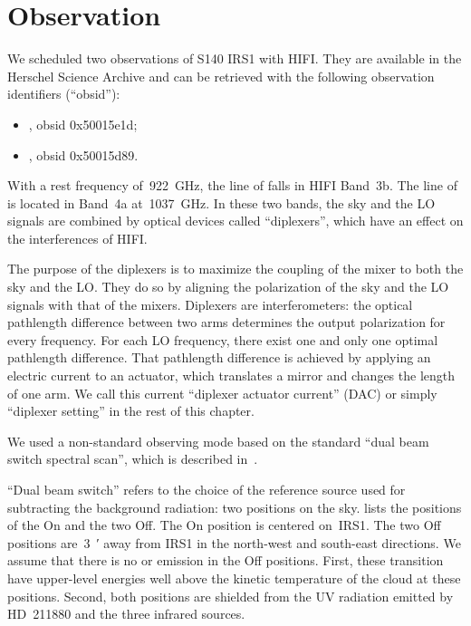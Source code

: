 \FloatBarrier
\section{Observation}

We scheduled two observations of S140 IRS1 with HIFI.
They are available in the Herschel Science Archive and can be retrieved with the following observation identifiers (``obsid''):
\begin{itemize}
    \item {}, obsid 0x50015e1d;
    \item {}, obsid 0x50015d89.
\end{itemize}

With a rest frequency of~\SI{922}{\giga\hertz}, the line of  falls in HIFI Band~3b.
The line of  is located in Band~4a at~\SI{1037}{\giga\hertz}.
In these two bands, the sky and the LO signals are combined by optical devices called ``diplexers'', which have an effect on the interferences of HIFI.

The purpose of the diplexers is to maximize the coupling of the mixer to both the sky and the LO.
They do so by aligning the polarization of the sky and the LO signals with that of the mixers.
Diplexers are interferometers: the optical pathlength difference between two arms determines the output polarization for every frequency.
For each LO frequency, there exist one and only one optimal pathlength difference.
That pathlength difference is achieved by applying an electric current to an actuator, which translates a mirror and changes the length of one arm.
We call this current ``diplexer actuator current'' (DAC) or simply ``diplexer setting'' in the rest of this chapter.

We used a non-standard observing mode based on the standard ``dual beam switch spectral scan'', which is described in~\cite{hifiobserversmanual}.

``Dual beam switch'' refers to the choice of the reference source used for subtracting the background radiation: two positions on the sky.
 lists the positions of the On and the two Off.
The On position is centered on~IRS1.
The two Off positions are~\SI{3}{\arcmin} away from IRS1 in the north-west and south-east directions.
We assume that there is no  or  emission in the Off positions.
First, these transition have upper-level energies well above the kinetic temperature of the cloud at these positions.
Second, both positions are shielded from the UV radiation emitted by HD~211880 and the three infrared sources.

